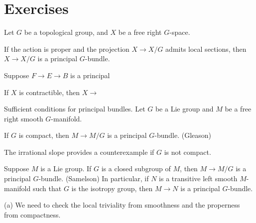 \documentclass{../../large}
\begin{document}
\section*{Exercises}

\begin{prb}
Let $G$ be a topological group, and $X$ be a free right $G$-space.
\begin{parts}
\item If the action is proper and the projection $X\to X/G$ admits local sections, then $X\to X/G$ is a principal $G$-bundle.
\end{parts}
\end{prb}

\begin{prb}
	
\end{prb}

\begin{prb}
Suppose $F\to E\to B$ is a principal 
\begin{parts}
\item If $X$ is contractible, then $X\to$
\end{parts}
\end{prb}

\begin{prb}
Sufficient conditions for principal bundles.
Let $G$ be a Lie group and $M$ be a free right smooth $G$-manifold.
\begin{parts}
\item If $G$ is compact, then $M\to M/G$ is a principal $G$-bundle. (Gleason)
\item The irrational slope provides a counterexample if $G$ is not compact.
\item Suppose $M$ is a Lie group.
If $G$ is a closed subgroup of $M$, then $M\to M/G$ is a principal $G$-bundle. (Samelson) In particular, if $N$ is a transitive left smooth $M$-manifold such that $G$ is the isotropy group, then $M\to N$ is a principal $G$-bundle.
\end{parts}
\end{prb}
\begin{pf}
(a) We need to check the local triviality from smoothness and the properness from compactness.
\end{pf}
\end{document}
